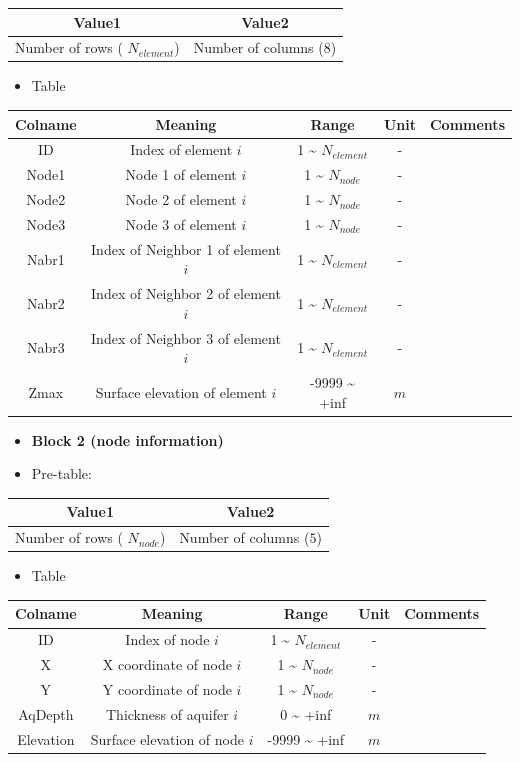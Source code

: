 \documentclass[]{scrbook}
\providecommand{\tightlist}{%
  \setlength{\itemsep}{0pt}\setlength{\parskip}{0pt}}
\begin{document}
\begin{longtable}[]{@{}cc@{}}
\toprule
Value1 & Value2\tabularnewline
\midrule
\endhead
Number of rows ( \(N_{element}\)) & Number of columns
(\(8\))\tabularnewline
\bottomrule
\end{longtable}

\begin{itemize}
\tightlist
\item
  Table
\end{itemize}

\begin{longtable}[]{@{}ccccc@{}}
\toprule
Colname & Meaning & Range & Unit & Comments\tabularnewline
\midrule
\endhead
ID & Index of element \(i\) & 1 \textasciitilde{} \(N_{element}\) & -
&\tabularnewline
Node1 & Node 1 of element \(i\) & 1 \textasciitilde{} \(N_{node}\) & -
&\tabularnewline
Node2 & Node 2 of element \(i\) & 1 \textasciitilde{} \(N_{node}\) & -
&\tabularnewline
Node3 & Node 3 of element \(i\) & 1 \textasciitilde{} \(N_{node}\) & -
&\tabularnewline
Nabr1 & Index of Neighbor 1 of element \(i\) & 1 \textasciitilde{}
\(N_{element}\) & - &\tabularnewline
Nabr2 & Index of Neighbor 2 of element \(i\) & 1 \textasciitilde{}
\(N_{element}\) & - &\tabularnewline
Nabr3 & Index of Neighbor 3 of element \(i\) & 1 \textasciitilde{}
\(N_{element}\) & - &\tabularnewline
Zmax & Surface elevation of element \(i\) & -9999 \textasciitilde{} +inf
& \(m\) &\tabularnewline
\bottomrule
\end{longtable}

\begin{itemize}
\item
  \textbf{Block 2 (node information)}
\item
  Pre-table:
\end{itemize}

\begin{longtable}[]{@{}cc@{}}
\toprule
Value1 & Value2\tabularnewline
\midrule
\endhead
Number of rows ( \(N_{node}\)) & Number of columns
(\(5\))\tabularnewline
\bottomrule
\end{longtable}

\begin{itemize}
\tightlist
\item
  Table
\end{itemize}

\begin{longtable}[]{@{}ccccc@{}}
\toprule
Colname & Meaning & Range & Unit & Comments\tabularnewline
\midrule
\endhead
ID & Index of node \(i\) & 1 \textasciitilde{} \(N_{element}\) & -
&\tabularnewline
X & X coordinate of node \(i\) & 1 \textasciitilde{} \(N_{node}\) & -
&\tabularnewline
Y & Y coordinate of node \(i\) & 1 \textasciitilde{} \(N_{node}\) & -
&\tabularnewline
AqDepth & Thickness of aquifer \(i\) & 0 \textasciitilde{} +inf & \(m\)
&\tabularnewline
Elevation & Surface elevation of node \(i\) & -9999 \textasciitilde{}
+inf & \(m\) &\tabularnewline
\bottomrule
\end{longtable}
\end{document}
